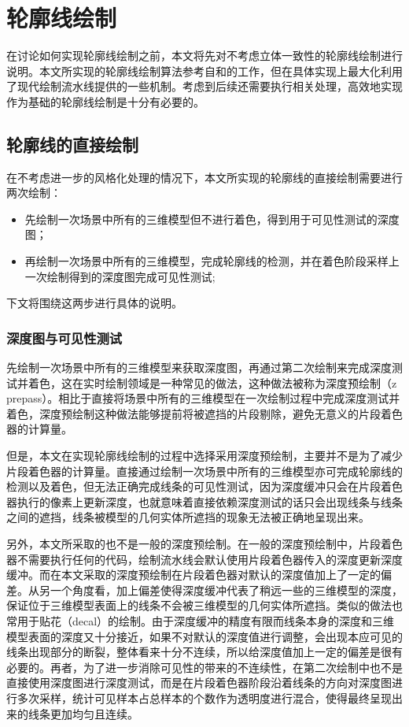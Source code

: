 \chapter{轮廓线绘制}

在讨论如何实现\stc{}轮廓线绘制之前，本文将先对不考虑立体一致性的轮廓线绘制进行说明。本文所实现的轮廓线绘制算法参考自\citeauthor{northrup2000artistic}和\citeauthor{isenberg2002stylizing}的工作\cite{northrup2000artistic,isenberg2002stylizing}，但在具体实现上最大化利用了现代绘制流水线提供的一些机制。考虑到后续还需要执行\stc{}相关处理，高效地实现作为基础的轮廓线绘制是十分有必要的。

\section{轮廓线的直接绘制}

在不考虑进一步的风格化处理的情况下，本文所实现的轮廓线的直接绘制需要进行两次绘制：

\begin{itemize}
    \item 先绘制一次场景中所有的三维模型但不进行着色，得到用于可见性测试的深度图；
    \item 再绘制一次场景中所有的三维模型，完成轮廓线的检测，并在着色阶段采样上一次绘制得到的深度图完成可见性测试;
\end{itemize}

下文将围绕这两步进行具体的说明。

\subsection{深度图与可见性测试}

先绘制一次场景中所有的三维模型来获取深度图，再通过第二次绘制来完成深度测试并着色，这在实时绘制领域是一种常见的做法，这种做法被称为深度预绘制（z prepass）。相比于直接将场景中所有的三维模型在一次绘制过程中完成深度测试并着色，深度预绘制这种做法能够提前将被遮挡的片段剔除，避免无意义的片段着色器的计算量。

但是，本文在实现轮廓线绘制的过程中选择采用深度预绘制，主要并不是为了减少片段着色器的计算量。直接通过绘制一次场景中所有的三维模型亦可完成轮廓线的检测以及着色，但无法正确完成线条的可见性测试，因为深度缓冲只会在片段着色器执行的像素上更新深度，也就意味着直接依赖深度测试的话只会出现线条与线条之间的遮挡，线条被模型的几何实体所遮挡的现象无法被正确地呈现出来。

另外，本文所采取的也不是一般的深度预绘制。在一般的深度预绘制中，片段着色器不需要执行任何的代码，绘制流水线会默认使用片段着色器传入的深度更新深度缓冲。而在本文采取的深度预绘制在片段着色器对默认的深度值加上了一定的偏差。从另一个角度看，加上偏差使得深度缓冲代表了稍远一些的三维模型的深度，保证位于三维模型表面上的线条不会被三维模型的几何实体所遮挡。类似的做法也常用于贴花（decal）的绘制。由于深度缓冲的精度有限而线条本身的深度和三维模型表面的深度又十分接近，如果不对默认的深度值进行调整，会出现本应可见的线条出现部分的断裂，整体看来十分不连续，所以给深度值加上一定的偏差是很有必要的。再者，为了进一步消除可见性的带来的不连续性，在第二次绘制中也不是直接使用深度图进行深度测试，而是在片段着色器阶段沿着线条的方向对深度图进行多次采样，统计可见样本占总样本的个数作为透明度进行混合，使得最终呈现出来的线条更加均匀且连续。


